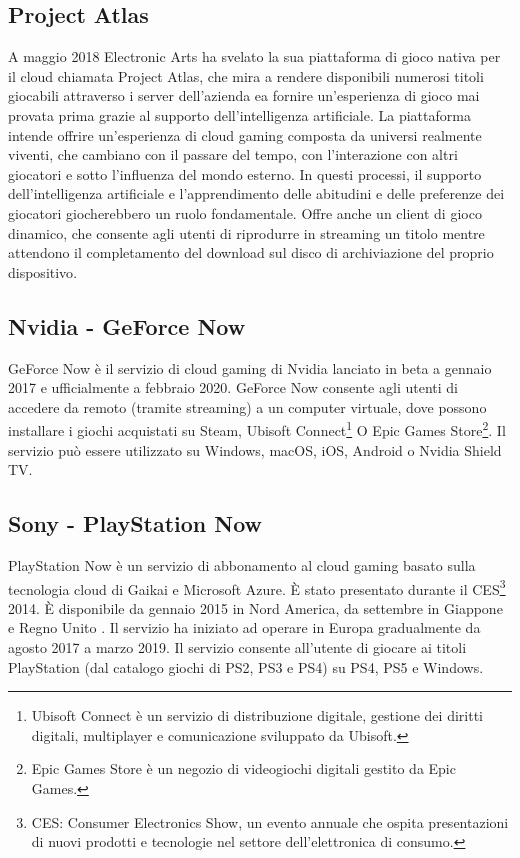 \subsection{Project Atlas}
A maggio 2018 Electronic Arts ha svelato la sua piattaforma di gioco nativa per il cloud chiamata Project Atlas, che mira a rendere disponibili numerosi titoli giocabili attraverso i server dell'azienda ea fornire un'esperienza di gioco mai provata prima grazie al supporto dell'intelligenza artificiale. La piattaforma intende offrire un'esperienza di cloud gaming composta da universi realmente viventi, che cambiano con il passare del tempo, con l'interazione con altri giocatori e sotto l'influenza del mondo esterno. In questi processi, il supporto dell'intelligenza artificiale e l'apprendimento delle abitudini e delle preferenze dei giocatori giocherebbero un ruolo fondamentale. Offre anche un client di gioco dinamico, che consente agli utenti di riprodurre in streaming un titolo mentre attendono il completamento del download sul disco di archiviazione del proprio dispositivo\cite{Project_Atlas}.

\subsection{Nvidia - GeForce Now}
GeForce Now è il servizio di cloud gaming di Nvidia lanciato in beta a gennaio 2017 e ufficialmente a febbraio 2020. GeForce Now consente agli utenti di accedere da remoto (tramite streaming) a un computer virtuale, dove possono installare i giochi acquistati su Steam, Ubisoft Connect\footnote{Ubisoft Connect è un servizio di distribuzione digitale, gestione dei diritti digitali, multiplayer e comunicazione sviluppato da Ubisoft.} O Epic Games Store\footnote{Epic Games Store è un negozio di videogiochi digitali gestito da Epic Games.}. Il servizio può essere utilizzato su Windows, macOS, iOS, Android o Nvidia Shield TV\cite{GeForce_Now}.

\subsection{Sony - PlayStation Now}
PlayStation Now è un servizio di abbonamento al cloud gaming basato sulla tecnologia cloud di Gaikai e Microsoft Azure. È stato presentato durante il CES\footnote{CES: Consumer Electronics Show, un evento annuale che ospita presentazioni di nuovi prodotti e tecnologie nel settore dell'elettronica di consumo.} 2014. È disponibile da gennaio 2015 in Nord America, da settembre in Giappone e Regno Unito . Il servizio ha iniziato ad operare in Europa gradualmente da agosto 2017 a marzo 2019. Il servizio consente all'utente di giocare ai titoli PlayStation (dal catalogo giochi di PS2, PS3 e PS4) su PS4, PS5 e Windows\cite{PlayStation_Now}.


